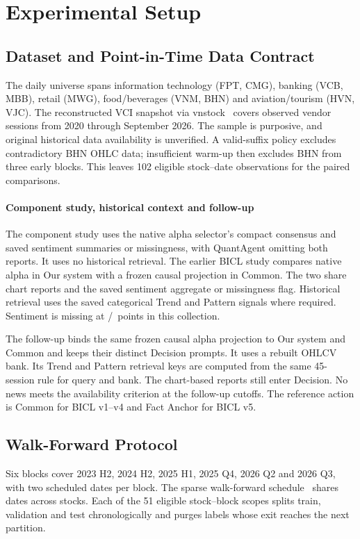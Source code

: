\section{Experimental Setup}
\label{sec:experimentalsetup}

\subsection{Dataset and Point-in-Time Data Contract}
The daily universe spans information technology (FPT, CMG), banking (VCB, MBB), retail (MWG), food/beverages (VNM, BHN) and aviation/tourism (HVN, VJC). The reconstructed VCI snapshot via vnstock~\cite{vnstock_docs} covers observed vendor sessions from 2020 through September 2026. The sample is purposive, and original historical data availability is unverified. A valid-suffix policy excludes contradictory BHN OHLC data; insufficient warm-up then excludes BHN from three early blocks. This leaves 102 eligible stock--date observations for the paired comparisons.

\paragraph{Component study, historical context and follow-up}
The component study uses the native alpha selector's compact consensus
and saved sentiment summaries or missingness, with QuantAgent omitting
both reports. It uses no historical retrieval. The earlier BICL study
compares native alpha in Our system with a frozen causal projection in
Common. The two share chart reports and the saved sentiment aggregate
or missingness flag. Historical retrieval uses the saved categorical
Trend and Pattern signals where required. Sentiment is missing at
\UnifiedMissingSentiment/\UnifiedPoints\ points in this collection.

The follow-up binds the same frozen causal alpha projection to Our
system and Common and keeps their distinct Decision prompts. It uses
a rebuilt OHLCV bank. Its Trend and Pattern retrieval keys are computed
from the same 45-session rule for query and bank. The chart-based
reports still enter Decision. No news meets the availability criterion
at the follow-up cutoffs. The reference action is Common for BICL
v1--v4 and Fact Anchor for BICL v5.

\subsection{Walk-Forward Protocol}
Six blocks cover 2023 H2, 2024 H2, 2025 H1, 2025 Q4, 2026 Q2 and 2026 Q3, with two scheduled dates per block. The sparse walk-forward schedule~\cite{pardo2008evaluation} shares dates across stocks. Each of the 51 eligible stock--block scopes splits train, validation and test chronologically and purges labels whose exit reaches the next partition.


